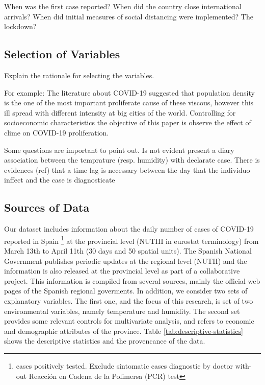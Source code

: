 \documentclass[]{elsarticle} %
\begin{document}
When was the first case reported? When did the country close
international arrivals? When did initial measures of social distancing
were implemented? The lockdown?

\hypertarget{selection-of-variables}{%
\subsection{Selection of Variables}\label{selection-of-variables}}

Explain the rationale for selecting the variables.

For example: The literature about COVID-19 suggested that population
density is the one of the most important proliferate cause of these
viscous, however this ill spread with different intensity at big cities
of the world. Controlling for socioeconomic characteristics the
objective of this paper is observe the effect of clime on COVID-19
proliferation.

Some questions are important to point out. Is not evident present a
diary association between the temprature (resp. humidity) with declarate
case. There is evidences (ref) that a time lag is necessary between the
day that the individuo inffect and the case is diagnosticate

\hypertarget{sources-of-data}{%
\subsection{Sources of Data}\label{sources-of-data}}

Our dataset includes information about the daily number of cases of
COVID-19 reported in Spain
\footnote{cases positively tested. Exclude sintomatic cases diagnostic by doctor with-out Reacción en Cadena de la Polimersa (PCR) test}
at the provincial level (NUTIII in eurostat terminology) from March 13th
to April 11th (30 days and 50 spatial units). The Spanish National
Government publishes periodic updates at the regional level (NUTII) and
the information is also released at the provincial level as part of a
collaborative project. This information is compiled from several
sources, mainly the official web pages of the Spanish regional
goverments. In addition, we consider two sets of explanatory variables.
The first one, and the focus of this research, is set of two
environmental variables, namely temperature and humidity. The second set
provides some relevant controls for multivariate analysis, and refers to
economic and demographic attributes of the province. Table
\ref{tab:descriptive-statistics} shows the descriptive statistics and
the provencance of the data.
\end{document}
